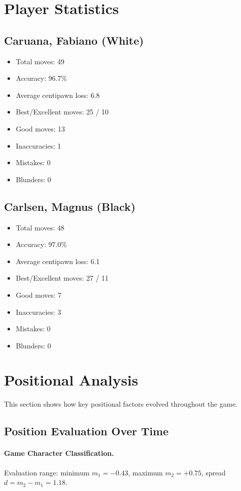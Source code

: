 \documentclass[11pt]{book}
\begin{document}
\section{Player Statistics}

\subsection{Caruana, Fabiano (White)}
\begin{itemize}
\item Total moves: 49
\item Accuracy: 96.7\%
\item Average centipawn loss: 6.8
\item Best/Excellent moves: 25 / 10
\item Good moves: 13
\item Inaccuracies: 1
\item Mistakes: 0
\item Blunders: 0
\end{itemize}

\subsection{Carlsen, Magnus (Black)}
\begin{itemize}
\item Total moves: 48
\item Accuracy: 97.0\%
\item Average centipawn loss: 6.1
\item Best/Excellent moves: 27 / 11
\item Good moves: 7
\item Inaccuracies: 3
\item Mistakes: 0
\item Blunders: 0
\end{itemize}

\section{Positional Analysis}

This section shows how key positional factors evolved throughout the game.

\subsection{Position Evaluation Over Time}

\paragraph{Game Character Classification.}
Evaluation range: minimum $m_1 = -0.43$, maximum $m_2 = +0.75$, spread $d = m_2 - m_1 = 1.18$.
\end{document}
